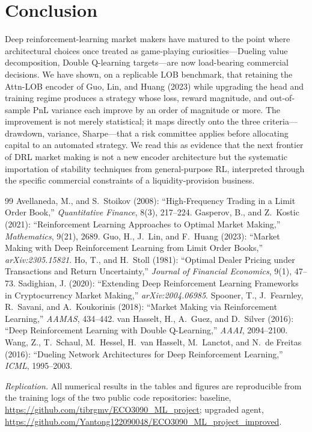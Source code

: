 \documentclass[12pt]{article}
\begin{document}
\FloatBarrier
\section{Conclusion}

Deep reinforcement-learning market makers have matured to the point where architectural choices once treated as game-playing curiosities---Dueling value decomposition, Double Q-learning targets---are now load-bearing commercial decisions. We have shown, on a replicable LOB benchmark, that retaining the Attn-LOB encoder of Guo, Lin, and Huang (2023) while upgrading the head and training regime produces a strategy whose loss, reward magnitude, and out-of-sample PnL variance each improve by an order of magnitude or more. The improvement is not merely statistical; it maps directly onto the three criteria---drawdown, variance, Sharpe---that a risk committee applies before allocating capital to an automated strategy. We read this as evidence that the next frontier of DRL market making is not a new encoder architecture but the systematic importation of stability techniques from general-purpose RL, interpreted through the specific commercial constraints of a liquidity-provision business.

\clearpage
\begin{thebibliography}{99}\small
{} Avellaneda, M., and S.~Stoikov (2008): ``High-Frequency Trading in a Limit Order Book,'' \textit{Quantitative Finance}, 8(3), 217--224.
 Gasperov, B., and Z.~Kostic (2021): ``Reinforcement Learning Approaches to Optimal Market Making,'' \textit{Mathematics}, 9(21), 2689.
 Guo, H., J.~Lin, and F.~Huang (2023): ``Market Making with Deep Reinforcement Learning from Limit Order Books,'' \textit{arXiv:2305.15821}.
 Ho, T., and H.~Stoll (1981): ``Optimal Dealer Pricing under Transactions and Return Uncertainty,'' \textit{Journal of Financial Economics}, 9(1), 47--73.
 Sadighian, J. (2020): ``Extending Deep Reinforcement Learning Frameworks in Cryptocurrency Market Making,'' \textit{arXiv:2004.06985}.
 Spooner, T., J.~Fearnley, R.~Savani, and A.~Koukorinis (2018): ``Market Making via Reinforcement Learning,'' \textit{AAMAS}, 434--442.
 van Hasselt, H., A.~Guez, and D.~Silver (2016): ``Deep Reinforcement Learning with Double Q-Learning,'' \textit{AAAI}, 2094--2100.
 Wang, Z., T.~Schaul, M.~Hessel, H.~van Hasselt, M.~Lanctot, and N.~de Freitas (2016): ``Dueling Network Architectures for Deep Reinforcement Learning,'' \textit{ICML}, 1995--2003.
\end{thebibliography}

\vspace{1em}
\noindent\small\textit{Replication.} All numerical results in the tables and figures are reproducible from the training logs of the two public code repositories: baseline, \url{https://github.com/tibrgmv/ECO3090_ML_project}; upgraded agent, \url{https://github.com/Yantong122090048/ECO3090_ML_project_improved}.
\end{document}
